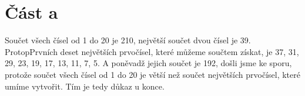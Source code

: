 \documentclass{fkssolpub}
\author{Ondřej Sedláček}
\begin{document}
\section{Část a}

Součet všech čísel od 1 do 20 je 210, největší součet dvou čísel je 39.
ProtopPrvních deset největších prvočísel, které můžeme součtem získat,
je 37, 31, 29, 23, 19, 17, 13, 11, 7, 5.
A poněvadž jejich součet je 192, došli jsme ke sporu, protože součet všech čísel
od 1 do 20 je větší než součet největších prvočísel, které umíme vytvořit.
Tím je tedy důkaz u konce.
\end{document}
